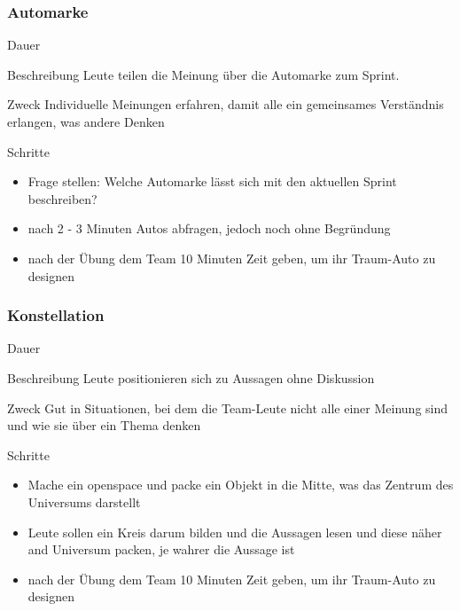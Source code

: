 \subsubsection{Automarke}
\begin{Beschreibungfett}[Beschreibung]
  \item [Dauer]
  \item [Beschreibung] Leute teilen die Meinung über die Automarke zum Sprint.
  \item [Zweck] Individuelle Meinungen erfahren, damit alle ein gemeinsames Verständnis erlangen,
    was andere Denken
  \item [Schritte]
    \begin{itemize}
      \item Frage stellen: Welche Automarke lässt sich mit den aktuellen Sprint beschreiben?
      \item nach 2 - 3 Minuten Autos abfragen, jedoch noch ohne Begründung
      \item nach der Übung dem Team 10 Minuten Zeit geben, um ihr Traum-Auto zu designen
    \end{itemize}
\end{Beschreibungfett}


\subsubsection{Konstellation}
\begin{Beschreibungfett}[Beschreibung]
  \item [Dauer]
  \item [Beschreibung] Leute positionieren sich zu Aussagen ohne Diskussion
  \item [Zweck] Gut in Situationen, bei dem die Team-Leute nicht alle einer Meinung sind und wie sie
    über ein Thema denken
  \item [Schritte]
    \begin{itemize}
      \item Mache ein openspace und packe ein Objekt in die Mitte, was das Zentrum des Universums
        darstellt
      \item Leute sollen ein Kreis darum bilden und die Aussagen lesen und diese näher and Universum
        packen, je wahrer die Aussage ist
      \item nach der Übung dem Team 10 Minuten Zeit geben, um ihr Traum-Auto zu designen
    \end{itemize}
\end{Beschreibungfett}

